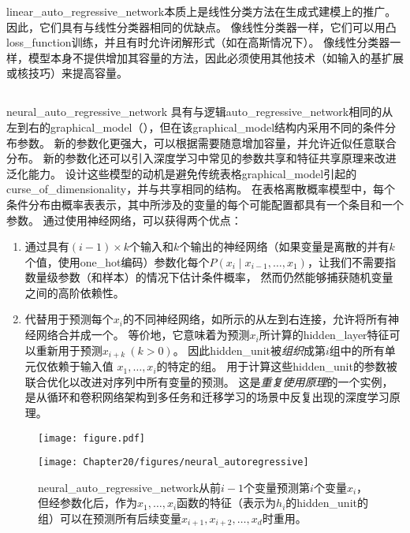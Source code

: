 \gls{linear_auto_regressive_network}本质上是线性分类方法在生成式建模上的推广。
因此，它们具有与线性分类器相同的优缺点。
像线性分类器一样，它们可以用凸\gls{loss_function}训练，并且有时允许闭解形式（如在高斯情况下）。
像线性分类器一样，模型本身不提供增加其容量的方法，因此必须使用其他技术（如输入的基扩展或核技巧）来提高容量。


\subsection{}
\label{sec:neural_auto_regressive_networks}

\gls{neural_auto_regressive_network} \citep{Bengio+Bengio-trnn2000,Bengio+Bengio-NIPS2000}具有与逻辑\gls{auto_regressive_network}相同的从左到右的\gls{graphical_model}（），但在该\gls{graphical_model}结构内采用不同的条件分布参数。
新的参数化更强大，可以根据需要随意增加容量，并允许近似任意联合分布。
新的参数化还可以引入深度学习中常见的参数共享和特征共享原理来改进泛化能力。
设计这些模型的动机是避免传统表格\gls{graphical_model}引起的\gls{curse_of_dimensionality}，并与共享相同的结构。
在表格离散概率模型中，每个条件分布由概率表表示，其中所涉及的变量的每个可能配置都具有一个条目和一个参数。
通过使用神经网络，可以获得两个优点：
\begin{enumerate}
 \item 通过具有$(i-1) \times k$个输入和$k$个输出的神经网络（如果变量是离散的并有$k$个值，使用\gls{one_hot}编码）参数化每个$P(x_i  \mid  x_{i-1}, \dots, x_1)$，让我们不需要指数量级参数（和样本）的情况下估计条件概率， 然而仍然能够捕获随机变量之间的高阶依赖性。

 \item 代替用于预测每个$x_i$的不同神经网络，如所示的从左到右连接，允许将所有神经网络合并成一个。
 等价地，它意味着为预测$x_i$所计算的\gls{hidden_layer}特征可以重新用于预测$x_{i+k}~(k > 0)$。
 因此\gls{hidden_unit}被\emph{组织}成第$i$组中的所有单元仅依赖于输入值 $x_1, \dots, x_i$的特定的组。
 用于计算这些\gls{hidden_unit}的参数被联合优化以改进对序列中所有变量的预测。
 这是\emph{重复使用原理}的一个实例，是从循环和卷积网络架构到多任务和迁移学习的场景中反复出现的深度学习原理。

\end{enumerate}

\begin{figure}[!htb]
\ifOpenSource
\centerline{\texttt{[image: figure.pdf]}}
\else
\centerline{\texttt{[image: Chapter20/figures/neural\_autoregressive]}}
\fi
\caption{\gls{neural_auto_regressive_network}从前$i-1$个变量预测第$i$个变量$x_i$，但经参数化后，作为$x_1,\dots,x_i$函数的特征（表示为$h_i$的\gls{hidden_unit}的组）可以在预测所有后续变量$x_{i+1},x_{i+2},\dots,x_{d}$时重用。
}
\label{fig:chap20_neural_autoregressive}
\end{figure}


